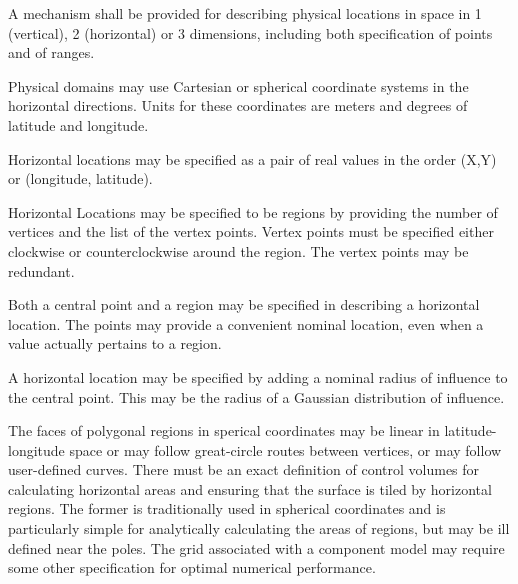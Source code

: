 
A mechanism shall be provided for describing physical locations in space in 1
(vertical), 2 (horizontal) or 3 dimensions, including both specification of
points and of ranges. 




Physical domains may use Cartesian or spherical coordinate systems in the
horizontal directions.  Units for these coordinates are meters and degrees of
latitude and longitude.


   Horizontal locations may be specified as a pair of real values in the order
(X,Y) or (longitude, latitude).



  Horizontal Locations may be specified to be regions by providing the number
of vertices and the list of the vertex points.  Vertex points must be specified
either clockwise or counterclockwise around the region.  The vertex points
may be redundant.
 

  Both a central point and a region may be specified in describing a horizontal
location.  The points may provide a convenient nominal location, even when
a value actually pertains to a region.


  A horizontal location may be specified by adding a nominal radius of
influence to the central point.  This may be the radius of a Gaussian
distribution of influence.



The faces of polygonal regions in sperical coordinates may be linear in
latitude-longitude space or may follow great-circle routes between vertices, or
may follow user-defined curves.  There must be an exact definition of control
volumes for calculating horizontal areas and ensuring that the surface is tiled
by horizontal regions. The former is traditionally used in spherical
coordinates and is particularly simple for analytically calculating the areas
of regions, but may be ill defined near the poles.  The grid associated with a
component model may require some other specification for optimal numerical
performance.

